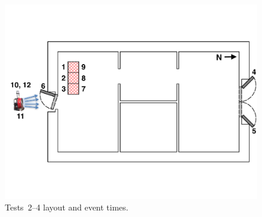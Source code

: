 \begin{figure}[!ht]
\begin{minipage}[b]{1.01\columnwidth}
\begin{center}
\end{center}
\end{minipage}
\begin{minipage}[b]{0.9\columnwidth}
	\vspace{20pt}
	\centering
	\includegraphics[width=\columnwidth]{Figures/Floor_Plans/East_Structure_Test_4}
\end{minipage}
\renewcommand{\baselinestretch}{1}
\caption{Tests~2--4 layout and event times.}
\label{fig:Tests_2-4_layout}
\end{figure}
\FloatBarrier

